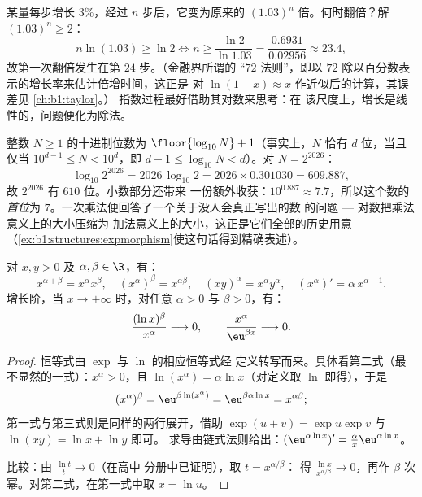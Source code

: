 \begin{example}[倍增时间]\label{ex:b1:functions:doubling}
某量每步增长 $3\%$，经过 $n$ 步后，它变为原来的
$(1.03)^n$ 倍。何时翻倍？解 $(1.03)^n
\geq 2$：
\[
n\ln(1.03) \geq \ln2
\iff n \geq \frac{\ln 2}{\ln 1.03}
= \frac{0.6931}{0.02956} \approx 23.4 ,
\]
故第一次翻倍发生在第 $24$ 步。（金融界所谓的
“$72$ 法则”，即以
$72$ 除以百分数表示的增长率来估计倍增时间，这正是
对 $\ln(1 + x) \approx x$ 作近似后的计算，其误差见
\cref{ch:b1:taylor}。）
指数过程最好借助其对数来思考：在
该尺度上，增长是线性的，问题便化为除法。
\end{example}

\begin{example}[$2^{2026}$ 有几位？]\label{ex:b1:functions:digits}
整数 $N \geq 1$ 的十进制位数为
$\floor{\log_{10} N} + 1$（事实上，$N$ 恰有 $d$ 位，当且仅当
$10^{d-1} \leq N < 10^d$，即 $d - 1 \leq \log_{10}N < d$）。对
$N = 2^{2026}$：
\[
\log_{10} 2^{2026} = 2026\,\log_{10}2
= 2026 \times 0.301030 = 609.887 ,
\]
故 $2^{2026}$ 有 $610$ 位。小数部分还带来
一份额外收获：$10^{0.887} \approx 7.7$，所以这个数的\emph{首位}为
$7$。一次乘法便回答了一个关于没人会真正写出的数
的问题 --- 对数把乘法意义上的大小压缩为
加法意义上的大小，这正是它们全部的历史用意
（\cref{ex:b1:structures:expmorphism}使这句话得到精确表述）。
\end{example}

\begin{proposition}[幂的运算法则与增长比较]\label{prop:b1:functions:powerrules}
对 $x, y > 0$ 及 $\alpha, \beta \in \R$，有：
\[
x^{\alpha+\beta} = x^\alpha x^\beta, \quad
(x^\alpha)^\beta = x^{\alpha\beta}, \quad
(xy)^\alpha = x^\alpha y^\alpha, \quad
(x^\alpha)' = \alpha\, x^{\alpha - 1}.
\]
增长阶，当 $x \to +\infty$ 时，对任意
$\alpha > 0$ 与 $\beta > 0$，有：
\[
\frac{(\ln x)^\beta}{x^\alpha} \longrightarrow 0,
\qquad
\frac{x^\alpha}{\eu^{\beta x}} \longrightarrow 0 .
\]
\end{proposition}

\begin{proof}
恒等式由 $\exp$ 与 $\ln$ 的相应恒等式经
定义转写而来。具体看第二式（最不显然的一式）：$x^\alpha
> 0$，且 $\ln(x^\alpha) = \alpha\ln x$（对定义取
$\ln$ 即得），于是
\[
(x^\alpha)^\beta = \eu^{\beta\ln(x^\alpha)}
= \eu^{\beta\alpha\ln x} = x^{\alpha\beta} ;
\]
第一式与第三式则是同样的两行展开，借助
$\exp(u + v) = \exp u\exp v$ 与 $\ln(xy) = \ln x + \ln y$ 即可。
求导由链式法则给出：$(\eu^{\alpha\ln x})' =
\frac{\alpha}{x} \eu^{\alpha\ln x}$。

比较：由 $\frac{\ln t}{t} \to 0$（在高中
分册中已证明），取 $t = x^{\alpha/\beta}$：
得 $\frac{\ln x}{x^{\alpha/\beta}} \to 0$，再作
$\beta$ 次幂。对第二式，在第一式中取 $x = \ln u$。
\end{proof}

